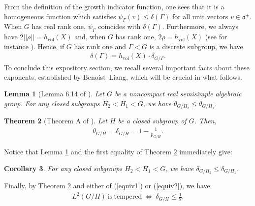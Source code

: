 \documentclass[psamsfonts]{amsart}
\newtheorem{thm}{Theorem}[section]
\newtheorem{cor}[thm]{Corollary}
\newtheorem{lem}[thm]{Lemma}
\theoremstyle{definition}
\theoremstyle{remark}
\numberwithin{equation}{section}
\begin{document}
From the definition of the growth indicator function, one sees that it is a homogeneous function which satisfies $\psi_{\Gamma}(v) \leq \delta(\Gamma)$ for all unit vectors $v \in \mathfrak{a}^{+}$. When $G$ has real rank one, $\psi_{\Gamma}$ coincides with $\delta(\Gamma)$. Furthermore, we always have $2||\rho|| = h_{\mathrm{vol}}(X)$ and, when $G$ has rank one, $2 \rho = h_{\mathrm{vol}}(X)$ (see for instance \cite{Leu}). Hence, if $G$ has rank one and $\Gamma < G$ is a discrete subgroup, we have 
\begin{align}
\label{realrankonerelations}
\delta(\Gamma) = h_{\mathrm{vol}}(X) \cdot \delta_{G/\Gamma}.
\end{align} To conclude this expository section, we recall several important facts about these exponents, established by Benoist--Liang, which will be crucial in what follows.
\begin{lem} [Lemma 6.14 of \cite{BL}]
\label{comparisonofcoeffdecay}
Let $G$ be a noncompact real semisimple algebraic group. For any closed subgroups $H_{2} < H_{1} < G$, we have $\theta_{G/H_{2}} \leq \theta_{G/H_{1}}$.
\end{lem} 
\begin{thm} [Theorem A of \cite{BL}]
\label{equalityofexponents}
Let $H$ be a closed subgroup of $G$. Then,
\begin{align*}
\theta_{G/H} = \delta_{G/H} = 1 - \frac{1}{p_{G/H}}.
\end{align*}
\end{thm} Notice that Lemma \ref{comparisonofcoeffdecay} and the first equality of Theorem \ref{equalityofexponents} immediately give:
\begin{cor}
\label{comparisonofcritexp}
For any closed subgroups $H_{2} < H_{1} < G$, we have $\delta_{G/H_{2}} \leq \delta_{G/H_{1}}$.
\end{cor} Finally, by Theorem \ref{equalityofexponents} and either of (\ref{equiv1}) or (\ref{equiv2}), we have
\begin{align}
\label{equiv3}
L^2(G/H) \ \mathrm{is \ tempered} \ \Longleftrightarrow \ \delta_{G/H} \leq \frac{1}{2}.
\end{align}
\end{document}
